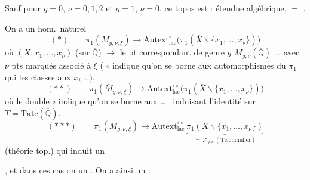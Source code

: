 \documentclass[11pt,a4paper]{article}
\begin{document}
Sauf pour $g = 0$, $\nu = 0, 1, 2$ et $g = 1$, $\nu = 0$, ce topos est
 : \ill{} étendue algébrique, \ill{} $=$ \ill{}.

On a un hom.\ naturel 
\[
  (*) \qquad \pi_1(M_{g,\nu;\xi}) \longrightarrow
  \mathrm{Autext}_{\mathrm{lac}}^{\circ}\bigl(\pi_1(\overline{X} \smallsetminus
  \{x_1, \ldots, x_\nu\})\bigr)
\]
où $(X; x_1, \ldots, x_\nu)$ (sur $\overline{\mathbb{Q}}$) $\to$ le pt
correspondant de genre $g$ \ill{} $M_{g,\nu}(\overline{\mathbb{Q}})$ \ldots\ avec
$\nu$ pts marqués associé à $\xi$ ( $\circ$ indique qu'on
se borne aux automorphismes du $\pi_1$ qui \ill{} les classes
 aux $x_i$ \ldots).  \ill{}
\[
  (**) \qquad \pi_1(\overline{M}_{g,\nu;\xi}) \longrightarrow
  \mathrm{Autext}_{\mathrm{lac}}^{\circ\circ}\bigl(\pi_1(\overline{X} \smallsetminus
  \{x_1, \ldots, x_\nu\})\bigr)
\]
où le double $\circ$ indique qu'on se borne aux \ill{} 
\ill{} \ldots\  \ill{} induisant l'identité sur
$T = \mathrm{Tate}(\overline{\mathbb{Q}})$.
\[
  (***) \qquad \pi_1(M_{g,\nu;\xi}) \longrightarrow
  \mathrm{Autext}_{\mathrm{lac}}^{\circ\circ}\,
  \underbrace{\pi_1(X \smallsetminus \{x_1, \ldots, x_\nu\})}_{=\ \mathcal{T}_{g,\nu}\ (\text{Teichmüller})}
\]
(théorie top.) qui induit un


, et dans ces cas on \ill{} \ill{} un \ill{} \ill{}.
On a ainsi un \ill{} :


\end{document}
